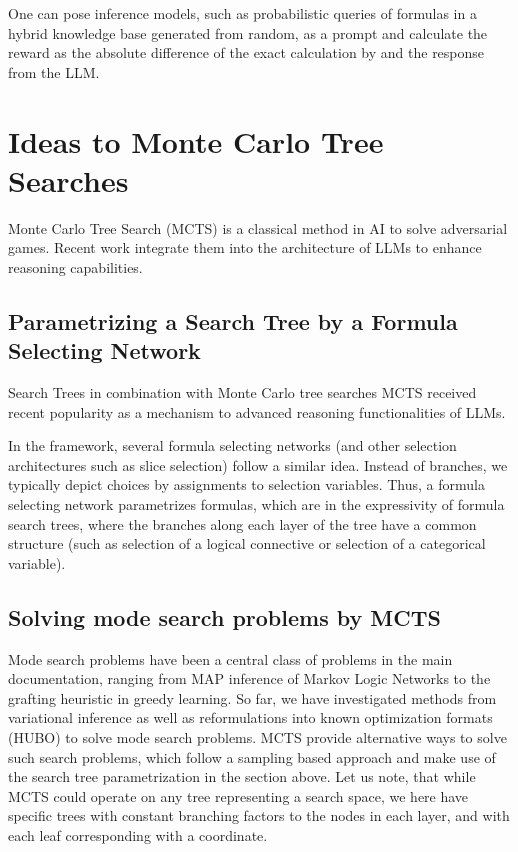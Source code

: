 \documentclass[aps,onecolumn,nofootinbib,pra]{article}
\begin{document}
One can pose \tnreason inference models, such as probabilistic queries of formulas in a hybrid knowledge base generated from random, as a prompt and calculate the reward as the absolute difference of the exact calculation by \tnreason and the response from the LLM.


\section{Ideas to Monte Carlo Tree Searches}

Monte Carlo Tree Search (MCTS) is a classical method in AI to solve adversarial games.
Recent work \cite{besta_reasoning_2025,xin_deepseek-prover-v15_2024} integrate them into the architecture of LLMs to enhance reasoning capabilities.


\subsection{Parametrizing a Search Tree by a Formula Selecting Network}

Search Trees in combination with Monte Carlo tree searches MCTS received recent popularity as a mechanism to advanced reasoning functionalities of LLMs.

In the \tnreason framework, several formula selecting networks (and other selection architectures such as slice selection) follow a similar idea.
Instead of branches, we typically depict choices by assignments to selection variables.
Thus, a formula selecting network parametrizes formulas, which are in the expressivity of formula search trees, where the branches along each layer of the tree have a common structure (such as selection of a logical connective or selection of a categorical variable).



\subsection{Solving mode search problems by MCTS}

Mode search problems have been a central class of problems in the main documentation, ranging from MAP inference of Markov Logic Networks to the grafting heuristic in greedy learning.
So far, we have investigated methods from variational inference as well as reformulations into known optimization formats (HUBO) to solve mode search problems.
MCTS provide alternative ways to solve such search problems, which follow a sampling based approach and make use of the search tree parametrization in the section above.
Let us note, that while MCTS could operate on any tree representing a search space, we here have specific trees with constant branching factors to the nodes in each layer, and with each leaf corresponding with a coordinate.
\end{document}
